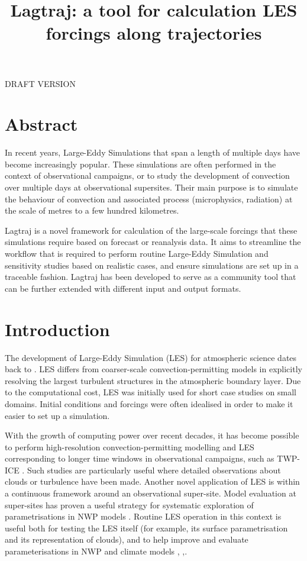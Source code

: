 \documentclass[a4paper,11pt]{article}
\title{Lagtraj: a tool for calculation LES forcings along trajectories}
\begin{document}
\maketitle

DRAFT VERSION

\section*{Abstract}

In recent years, Large-Eddy Simulations that span a length of
multiple days have become increasingly popular. These simulations are
often performed in the context of observational campaigns, or to study
the development of convection over multiple days at observational
supersites. Their main purpose is to simulate the behaviour of
convection and associated process (microphysics, radiation) at the
scale of metres to a few hundred kilometres.

Lagtraj is a novel framework for calculation of the large-scale
forcings that these simulations require based on forecast or reanalysis
data. It aims to streamline the workflow that is required to perform
routine Large-Eddy Simulation and sensitivity studies based on
realistic cases, and ensure simulations are set up in a traceable
fashion. Lagtraj has been developed to serve as a community tool that
can be further extended with different input and output formats.

\section{Introduction}

The development of Large-Eddy Simulation (LES) for atmospheric science
dates back to \cite{deardorff1970}. LES differs from coarser-scale
convection-permitting models in explicitly resolving the largest
turbulent structures in the atmospheric boundary layer. Due to the
computational cost, LES was initially used for short case studies on
small domains. Initial conditions and forcings were often idealised
in order to make it easier to set up a simulation.

With the growth of computing power over recent decades, it has become
possible to perform high-resolution convection-permitting
modelling and LES corresponding to longer time windows in observational
campaigns, such as TWP-ICE \citep{fridlind2012}. Such studies are
particularly useful where detailed observations about clouds or
turbulence have been made. Another novel application of LES is within a
continuous framework around an observational super-site. Model
evaluation at super-sites has proven a useful strategy for systematic
exploration of parametrisations in NWP models \cite{neggers2012}.
Routine LES operation in this context is useful both for testing the
LES itself (for example, its surface parametrisation and its
representation of clouds), and to help improve and evaluate
parameterisations in NWP and climate models \cite{schalkwijk2015},
\cite{laar2019},\cite{gustafson2020}.
\end{document}
